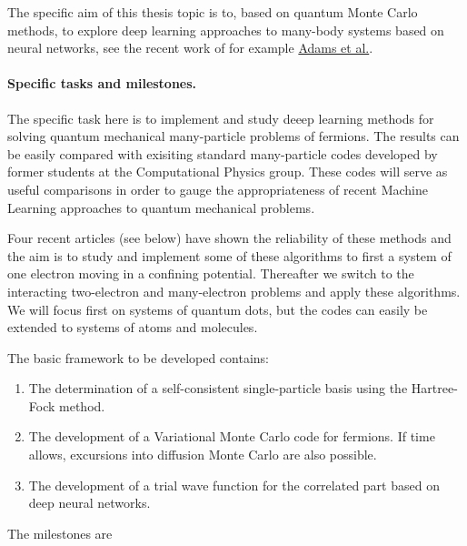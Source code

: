 \documentclass[%
oneside,                 %
final,                   %
10pt]{article}
\begin{document}
The specific aim of this
thesis topic is to, based on quantum Monte Carlo methods, to
explore deep learning approaches to many-body systems based on neural networks, see the recent work of for example
\href{{https://arxiv.org/abs/2007.14282}}{Adams et al.}. 

\paragraph{Specific tasks and milestones.}
The specific task here is to implement and study deeep learning methods 
for solving quantum mechanical many-particle
problems of fermions. The results can  be easily compared with exisiting standard
many-particle codes developed by former students at the Computational
Physics group. These codes will serve as useful comparisons in order
to gauge the appropriateness of recent Machine Learning approaches to
quantum mechanical problems.

Four recent articles (see below) have shown the reliability of these methods and
the aim is to study and implement some of these algorithms to first a system
of one electron moving in a confining potential. Thereafter we switch
to the interacting two-electron and many-electron problems and apply
these algorithms.  We will focus first on systems of quantum dots, but the codes can easily be extended to systems of atoms and molecules.

The basic framework to be developed contains:
\begin{enumerate}
\item The determination of a self-consistent single-particle basis using the Hartree-Fock method.

\item The development of a Variational Monte Carlo code for fermions. If time allows, excursions into diffusion Monte Carlo are also possible.

\item The development of a trial wave function for the correlated part based on deep neural networks.
\end{enumerate}

\noindent
The milestones are
\end{document}
